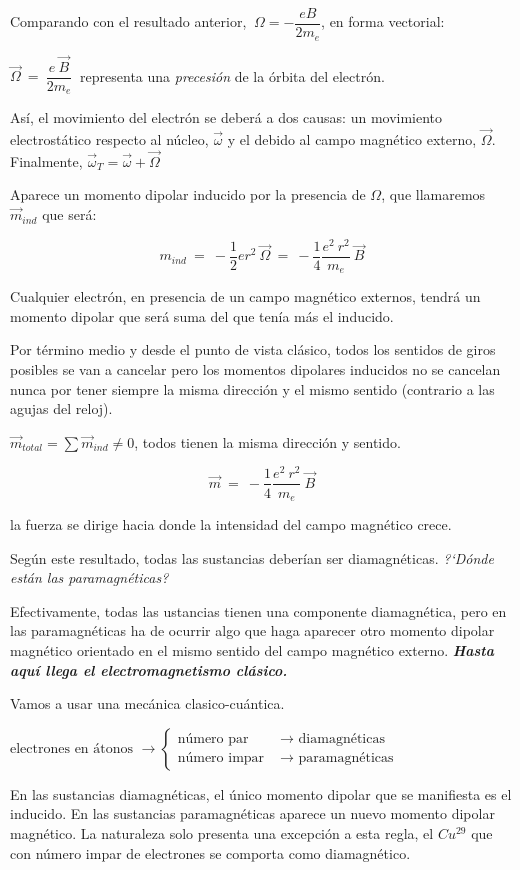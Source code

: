 Comparando con el resultado anterior, $\ \Omega=-\dfrac{eB}{2m_e}$, en forma vectorial:

$\vec \Omega \ = \ \dfrac{e\ \vec B}{2m_e}\ $  representa una \emph{precesión} de la órbita del electrón.

Así, el movimiento del electrón se deberá a dos causas: un movimiento electrostático respecto al núcleo, $\vec \omega$ y el debido al campo magnético externo, $\vec \Omega$. Finalmente, $\vec \omega_T=\vec \omega+\vec \Omega$

Aparece un momento dipolar inducido por la presencia de $\Omega$, que llamaremos $\vec m_{ind}$ que será:

$$m_{ind} \ = \ -\dfrac 1 2 e r^2 \ \vec \Omega \ =\ - \dfrac 1 4 \dfrac {e^2\ r^2}{m_e}\ \vec B$$

Cualquier electrón, en presencia de un campo magnético externos, tendrá un momento dipolar que será suma del que tenía más el inducido.

Por término medio y desde el punto de vista clásico, todos los sentidos de giros posibles se van a cancelar pero los momentos dipolares inducidos no se cancelan nunca por tener siempre la misma dirección y el mismo sentido (contrario a las agujas del reloj).

$\vec m_{total}=\sum \vec m_{ind} \neq 0$, todos tienen la misma dirección y sentido.

$$ \vec m \ = \ - \dfrac 1 4 \dfrac {e^2\ r^2}{m_e}\ \vec B$$

la fuerza se dirige hacia donde la intensidad del campo magnético crece.

Según este resultado, todas las sustancias deberían ser diamagnéticas. \emph{?`Dónde están las paramagnéticas?}

Efectivamente, todas las ustancias tienen una componente diamagnética, pero en las  paramagnéticas ha de ocurrir algo que haga aparecer otro momento dipolar magnético orientado en el mismo sentido del campo magnético externo. \textbf{\emph{Hasta aquí llega el electromagnetismo clásico.}}

Vamos a usar una mecánica clasico-cuántica.

$\text{electrones en átonos } \to 
	\begin{cases}
		\text{número par } &\to  \text{\ diamagnéticas} \\ 
		\text{número impar } &\to  \text{\ paramagnéticas}
 	\end{cases}$

En las sustancias diamagnéticas, el único momento dipolar que se manifiesta es el inducido. En las sustancias paramagnéticas aparece un nuevo momento dipolar magnético. La naturaleza solo presenta una excepción a esta regla, el $Cu^{29}$ que con número impar de electrones se comporta como diamagnético.

